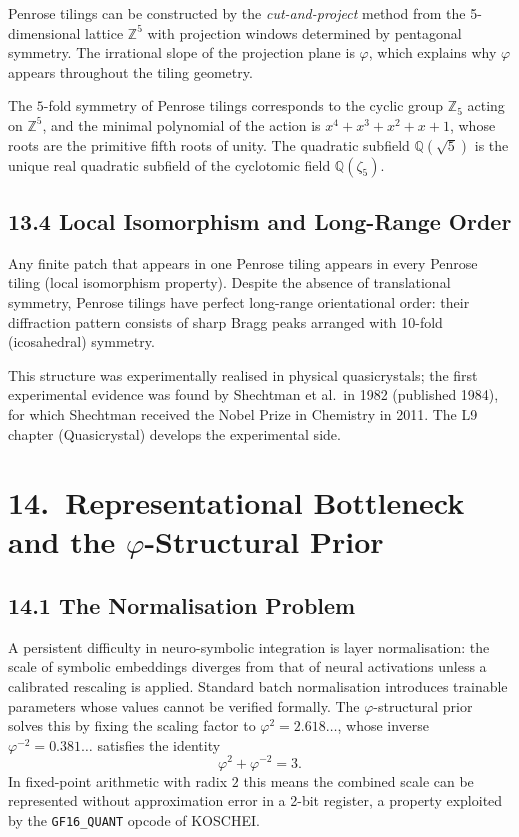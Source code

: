 Penrose tilings can be constructed by the
\emph{cut-and-project} method from the
5-dimensional lattice $\mathbb{Z}^5$ with
projection windows determined by pentagonal
symmetry.
The irrational slope of the projection plane is
$\varphi$, which explains why $\varphi$ appears
throughout the tiling geometry.

The $5$-fold symmetry of Penrose tilings corresponds
to the cyclic group $\mathbb{Z}_5$ acting on
$\mathbb{Z}^5$, and the minimal polynomial of the
action is $x^4 + x^3 + x^2 + x + 1$, whose roots
are the primitive fifth roots of unity.
The quadratic subfield $\mathbb{Q}(\sqrt{5})$ is the
unique real quadratic subfield of the cyclotomic
field $\mathbb{Q}(\zeta_5)$.

\subsection{13.4 Local Isomorphism and Long-Range Order}
\label{subsec:gc-penrose-order}

Any finite patch that appears in one Penrose tiling
appears in every Penrose tiling (local isomorphism
property).
Despite the absence of translational symmetry,
Penrose tilings have perfect long-range orientational
order: their diffraction pattern consists of sharp
Bragg peaks arranged with 10-fold (icosahedral)
symmetry.

This structure was experimentally realised in
physical quasicrystals; the first experimental
evidence was found by Shechtman et al.\ in 1982
(published 1984), for which Shechtman received
the Nobel Prize in Chemistry in 2011.
The L9 chapter (Quasicrystal) develops the
experimental side.

\section{14.\ Representational Bottleneck and the
$\varphi$-Structural Prior}
\label{sec:gc-prior}

\subsection{14.1 The Normalisation Problem}
\label{subsec:gc-normalisation}

A persistent difficulty in neuro-symbolic
integration is layer normalisation: the scale of
symbolic embeddings diverges from that of neural
activations unless a calibrated rescaling is
applied.
Standard batch normalisation introduces trainable
parameters whose values cannot be verified
formally.
The $\varphi$-structural prior solves this by fixing
the scaling factor to
$\varphi^2 = 2.618\ldots$, whose inverse
$\varphi^{-2} = 0.381\ldots$ satisfies the identity
\[
  \varphi^2 + \varphi^{-2} = 3.
\]
In fixed-point arithmetic with radix $2$ this means
the combined scale can be represented without
approximation error in a 2-bit register, a property
exploited by the \texttt{GF16\_QUANT} opcode of
KOSCHEI.

